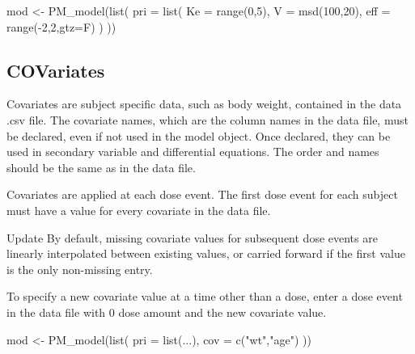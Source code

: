 \documentclass[
]{book}
\newenvironment{Shaded}{\begin{snugshade}}{\end{snugshade}}
\newcommand{\AttributeTok}[1]{\textcolor[rgb]{0.77,0.63,0.00}{#1}}
\newcommand{\DecValTok}[1]{\textcolor[rgb]{0.00,0.00,0.81}{#1}}
\newcommand{\FunctionTok}[1]{\textcolor[rgb]{0.00,0.00,0.00}{#1}}
\newcommand{\NormalTok}[1]{#1}
\newcommand{\OtherTok}[1]{\textcolor[rgb]{0.56,0.35,0.01}{#1}}
\newcommand{\SpecialCharTok}[1]{\textcolor[rgb]{0.00,0.00,0.00}{#1}}
\newcommand{\StringTok}[1]{\textcolor[rgb]{0.31,0.60,0.02}{#1}}
\begin{document}
\begin{Shaded}
\begin{Highlighting}[]
\NormalTok{mod }\OtherTok{\textless{}{-}} \FunctionTok{PM\_model}\NormalTok{(}\FunctionTok{list}\NormalTok{(}
  \AttributeTok{pri =} \FunctionTok{list}\NormalTok{(}
    \AttributeTok{Ke =} \FunctionTok{range}\NormalTok{(}\DecValTok{0}\NormalTok{,}\DecValTok{5}\NormalTok{),}
    \AttributeTok{V =} \FunctionTok{msd}\NormalTok{(}\DecValTok{100}\NormalTok{,}\DecValTok{20}\NormalTok{),}
    \AttributeTok{eff =} \FunctionTok{range}\NormalTok{(}\SpecialCharTok{{-}}\DecValTok{2}\NormalTok{,}\DecValTok{2}\NormalTok{,}\AttributeTok{gtz=}\NormalTok{F)}
\NormalTok{  )}
\NormalTok{))}
\end{Highlighting}
\end{Shaded}

\hypertarget{covR6}{%
\subsection{COVariates}\label{covR6}}

Covariates are subject specific data, such as body weight, contained in
the data .csv file. The covariate names, which are the column names in
the data file, must be declared, even if not used in the model object. Once declared, they can be used in secondary variable
and differential equations. The order and names should be the same as in the data file.

Covariates are applied at each dose event. The first dose event for each
subject must have a value for every covariate in the data file.

{Update} By default, missing covariate values for subsequent dose events are linearly interpolated between existing values, or carried forward if the first value is the only non-missing entry.

To specify a new covariate value at a time other than a dose, enter a dose event in the data file with 0 dose amount and the new covariate value.

\begin{Shaded}
\begin{Highlighting}[]
\NormalTok{mod }\OtherTok{\textless{}{-}} \FunctionTok{PM\_model}\NormalTok{(}\FunctionTok{list}\NormalTok{(}
  \AttributeTok{pri =} \FunctionTok{list}\NormalTok{(...),}
  \AttributeTok{cov =} \FunctionTok{c}\NormalTok{(}\StringTok{"wt"}\NormalTok{,}\StringTok{"age"}\NormalTok{)}
\NormalTok{))}
\end{Highlighting}
\end{Shaded}
\end{document}

